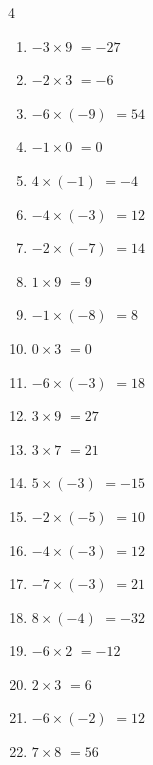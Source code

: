 \begin{multicols}{4}
\begin{enumerate}
  \item $-3\times 9$
        $=-27$

  \item $-2\times 3$
        $=-6$

  \item $-6\times (-9)$
        $=54$

  \item $-1\times 0$
        $=0$

  \item $4\times (-1)$
        $=-4$

  \item $-4\times (-3)$
        $=12$

  \item $-2\times (-7)$
        $=14$

  \item $1\times 9$
        $=9$

  \item $-1\times (-8)$
        $=8$

  \item $0\times 3$
        $=0$

  \item $-6\times (-3)$
        $=18$

  \item $3\times 9$
        $=27$

  \item $3\times 7$
        $=21$

  \item $5\times (-3)$
        $=-15$

  \item $-2\times (-5)$
        $=10$

  \item $-4\times (-3)$
        $=12$

  \item $-7\times (-3)$
        $=21$

\columnbreak %

  \item $8\times (-4)$
        $=-32$

  \item $-6\times 2$
        $=-12$

  \item $2\times 3$
        $=6$

  \item $-6\times (-2)$
        $=12$

  \item $7\times 8$
        $=56$


\end{enumerate}
\end{multicols}
